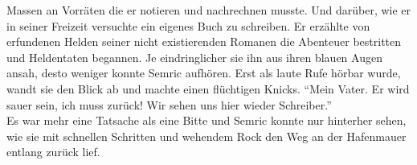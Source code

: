 Massen an Vorräten die er notieren und nachrechnen musste. Und darüber, wie er in seiner Freizeit 
versuchte ein eigenes Buch zu schreiben. Er erzählte von erfundenen Helden seiner nicht 
existierenden Romanen die Abenteuer bestritten und Heldentaten begannen. Je eindringlicher sie ihn 
aus ihren blauen Augen ansah, desto weniger konnte Semric aufhören. Erst als laute Rufe hörbar 
wurde, wandt sie den Blick ab und machte einen flüchtigen Knicks. ``Mein Vater. Er wird sauer sein, 
ich muss zurück! Wir sehen uns hier wieder Schreiber.''\\
Es war mehr eine Tatsache als eine Bitte und Semric konnte nur hinterher sehen, wie sie mit 
schnellen Schritten und wehendem Rock den Weg an der Hafenmauer entlang zurück lief.\\



